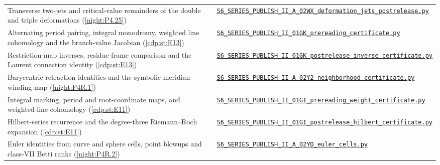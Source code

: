 {\begin{longtable}{@{}>{\raggedright\arraybackslash}p{}>{\raggedright\arraybackslash}p{}@{}}
Transverse two-jets and critical-value remainders of the double and triple deformations (\cref{night:P4.25}) & \href{https://raw.githubusercontent.com/KokunoYumeto/s6-complex-structure-workbench/\SsixRepositoryCommit/code/S6_SERIES_PUBLISH_II_A_02WX_deformation_jets_postrelease.py}{\nolinkurl{S6_SERIES_PUBLISH_II_A_02WX_deformation_jets_postrelease.py}} \\[3pt]
Alternating period pairing, integral monodromy, weighted line cohomology and the branch-value Jacobian (\cref{cdp:st:E13}) & \href{https://raw.githubusercontent.com/KokunoYumeto/s6-complex-structure-workbench/\SsixRepositoryCommit/code/S6_SERIES_PUBLISH_II_01GK_prereading_certificate.py}{\nolinkurl{S6_SERIES_PUBLISH_II_01GK_prereading_certificate.py}} \\[3pt]
Restriction-map inverses, residue-frame comparison and the Laurent connection identity (\cref{cdp:st:E13}) & \href{https://raw.githubusercontent.com/KokunoYumeto/s6-complex-structure-workbench/\SsixRepositoryCommit/code/S6_SERIES_PUBLISH_II_01GK_postrelease_inverse_certificate.py}{\nolinkurl{S6_SERIES_PUBLISH_II_01GK_postrelease_inverse_certificate.py}} \\[3pt]
Barycentric retraction identities and the symbolic meridian winding map (\cref{night:P4R.1}) & \href{https://raw.githubusercontent.com/KokunoYumeto/s6-complex-structure-workbench/\SsixRepositoryCommit/code/S6_SERIES_PUBLISH_II_A_02Y2_neighborhood_certificate.py}{\nolinkurl{S6_SERIES_PUBLISH_II_A_02Y2_neighborhood_certificate.py}} \\[3pt]
Integral marking, period and root-coordinate maps, and weighted-line cohomology (\cref{cdp:st:E11}) & \href{https://raw.githubusercontent.com/KokunoYumeto/s6-complex-structure-workbench/\SsixRepositoryCommit/code/S6_SERIES_PUBLISH_II_01GI_prereading_weight_certificate.py}{\nolinkurl{S6_SERIES_PUBLISH_II_01GI_prereading_weight_certificate.py}} \\[3pt]
Hilbert-series recurrence and the degree-three Riemann--Roch expansion (\cref{cdp:st:E11}) & \href{https://raw.githubusercontent.com/KokunoYumeto/s6-complex-structure-workbench/\SsixRepositoryCommit/code/S6_SERIES_PUBLISH_II_01GI_postrelease_hilbert_certificate.py}{\nolinkurl{S6_SERIES_PUBLISH_II_01GI_postrelease_hilbert_certificate.py}} \\[3pt]
Euler identities from curve and sphere cells, point blowups and class-VII Betti ranks (\cref{night:P4R.2}) & \href{https://raw.githubusercontent.com/KokunoYumeto/s6-complex-structure-workbench/\SsixRepositoryCommit/code/S6_SERIES_PUBLISH_II_A_02YD_euler_cells.py}{\nolinkurl{S6_SERIES_PUBLISH_II_A_02YD_euler_cells.py}} \\[3pt]

\end{longtable}}
